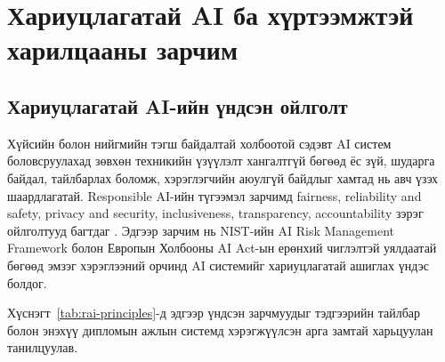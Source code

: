 
\section{Хариуцлагатай AI ба хүртээмжтэй харилцааны зарчим}

\subsection{Хариуцлагатай AI-ийн үндсэн ойлголт}

Хүйсийн болон нийгмийн тэгш байдалтай холбоотой сэдэвт AI систем боловсруулахад зөвхөн техникийн үзүүлэлт хангалтгүй бөгөөд ёс зүй, шударга байдал, тайлбарлах боломж, хэрэглэгчийн аюулгүй байдлыг хамтад нь авч үзэх шаардлагатай. Responsible AI-ийн түгээмэл зарчимд fairness, reliability and safety, privacy and security, inclusiveness, transparency, accountability зэрэг ойлголтууд багтдаг \cite{responsible_ai}. Эдгээр зарчим нь NIST-ийн AI Risk Management Framework \cite{nist_ai_rmf} болон Европын Холбооны AI Act-ын \cite{eu_ai_act} ерөнхий чиглэлтэй уялдаатай бөгөөд эмзэг хэрэглээний орчинд AI системийг хариуцлагатай ашиглах үндэс болдог.

Хүснэгт~\ref{tab:rai-principles}-д эдгээр үндсэн зарчмуудыг тэдгээрийн тайлбар болон энэхүү дипломын ажлын системд хэрэгжүүлсэн арга замтай харьцуулан танилцуулав.

